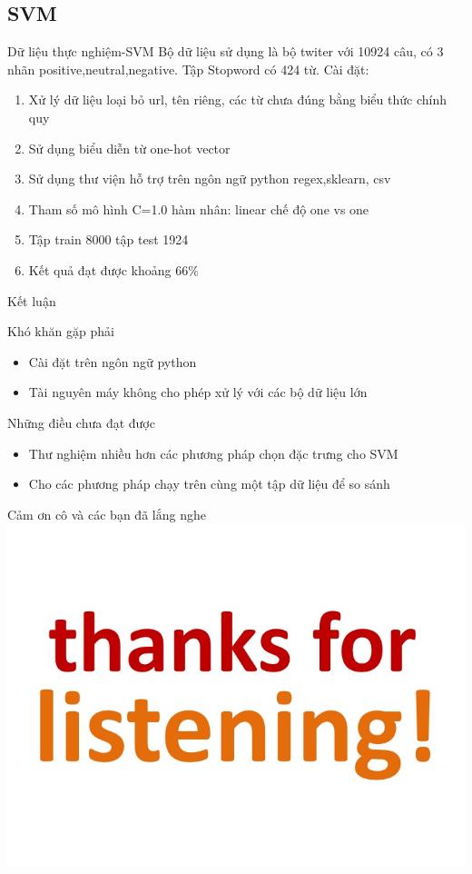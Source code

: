 \documentclass[compress]{beamer}
\begin{document}
\subsection{SVM}
\begin{frame}{Dữ liệu thực nghiệm-SVM}
Bộ dữ liệu sử dụng là bộ twiter với 10924 câu, có 3 nhãn positive,neutral,negative. 
Tập Stopword có  424 từ.
Cài đặt:
\begin{enumerate}
\item Xử lý dữ liệu loại bỏ url, tên riêng, các từ chưa đúng bằng biểu thức chính quy
\item Sử dụng biểu diễn từ one-hot vector
\item Sử dụng thư viện hỗ trợ trên ngôn ngữ python regex,sklearn, csv
\item Tham số mô hình C=1.0 hàm nhân: linear chế độ one vs one 
\item Tập train 8000 tập test 1924
\item Kết quả đạt được khoảng 66$\%$
\end{enumerate}
\end{frame}
\begin{frame}{Kết luận}

Khó khăn gặp phải
\begin{itemize}
\item Cài đặt trên ngôn ngữ python
\item Tài nguyên máy không cho phép xử lý với các bộ dữ liệu lớn
\end{itemize}

Những điều chưa đạt được 
\begin{itemize}
\item Thư nghiệm nhiều hơn các phương pháp chọn đặc trưng cho SVM
\item Cho các phương pháp chạy trên cùng một tập dữ liệu để so sánh 
\end{itemize}
\end{frame}
\begin{frame}{Cảm ơn cô và các bạn đã lắng nghe}
\includegraphics[scale=0.4]{thanks.jpg}
\end{frame}
\end{document}
